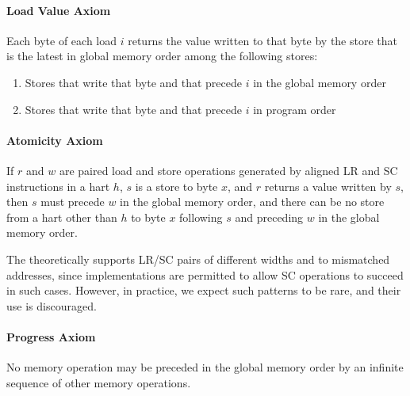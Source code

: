 \newcommand{\loadvalueaxiom}{
  Each byte of each load $i$ returns the value written to that byte by the store that is the latest in global memory order among the following stores:
  \begin{enumerate}
    \item Stores that write that byte and that precede $i$ in the global memory order
    \item Stores that write that byte and that precede $i$ in program order
  \end{enumerate}
}

\newcommand{\atomicityaxiom}{If $r$ and $w$ are paired load and store operations generated by aligned LR and SC instructions in a hart $h$, $s$ is a store to byte $x$, and $r$ returns a value written by $s$, then $s$ must precede $w$ in the global memory order, and there can be no store from a hart other than $h$ to byte $x$ following $s$ and preceding $w$ in the global memory order.}

\newcommand{\progressaxiom}{No memory operation may be preceded in the global memory order by an infinite sequence of other memory operations.}

\paragraph{Load Value Axiom}
\label{rvwmo:ax:load}
\loadvalueaxiom

\paragraph{Atomicity Axiom}
\label{rvwmo:ax:atom}
\atomicityaxiom

\begin{commentary}
  The  theoretically supports LR/SC pairs of different widths and to mismatched addresses, since implementations are permitted to allow SC operations to succeed in such cases.  However, in practice, we expect such patterns to be rare, and their use is discouraged.
\end{commentary}

\paragraph{Progress Axiom}
\label{rvwmo:ax:prog}
\progressaxiom



